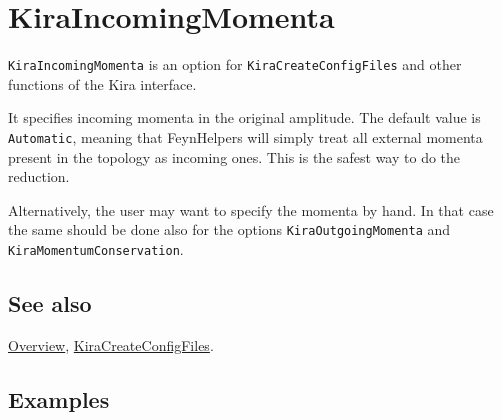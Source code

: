 \documentclass[../FeynHelpersManual.tex]{subfiles}
\begin{document}
\hypertarget{kiraincomingmomenta}{
\section{KiraIncomingMomenta}\label{kiraincomingmomenta}}

\texttt{KiraIncomingMomenta} is an option for
\texttt{KiraCreateConfigFiles} and other functions of the Kira
interface.

It specifies incoming momenta in the original amplitude. The default
value is \texttt{Automatic}, meaning that FeynHelpers will simply treat
all external momenta present in the topology as incoming ones. This is
the safest way to do the reduction.

Alternatively, the user may want to specify the momenta by hand. In that
case the same should be done also for the options
\texttt{KiraOutgoingMomenta} and \texttt{KiraMomentumConservation}.

\subsection{See also}

\hyperlink{toc}{Overview},
\hyperlink{kiracreateconfigfiles}{KiraCreateConfigFiles}.

\subsection{Examples}
\end{document}
